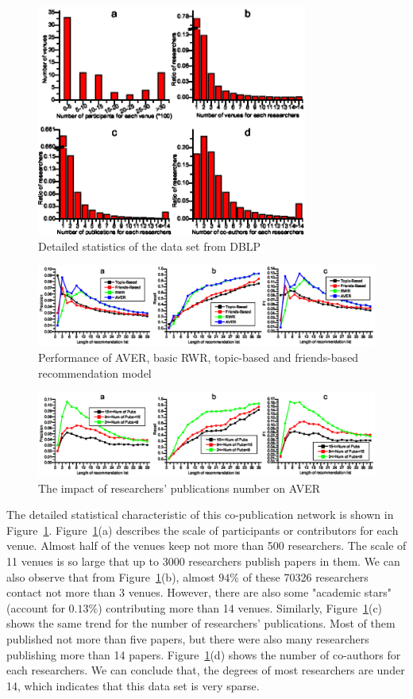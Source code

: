 \documentclass[9pt]{acm_proc_article-sp}
\begin{document}
\begin{figure}[t]
\centering
\includegraphics [width=3.5in]{Fig3.eps}
\caption{Detailed statistics of the data set from DBLP}
\label{fig3}
\end{figure}
\begin{figure}[hbt]
\centering
\includegraphics [width=\textwidth]{Fig4.eps}
\caption{Performance of AVER, basic RWR, topic-based and friends-based recommendation model}
\label{fig4}
\end{figure}
\begin{figure}[hbt]
\centering
\includegraphics [width=\textwidth]{Fig5.eps}
\caption{The impact of researchers' publications number on AVER}
\label{fig5}
\end{figure}

The detailed statistical characteristic of this co-publication network is shown in Figure~\ref{fig3}. Figure~\ref{fig3}(a) describes the scale of participants or contributors for each venue. Almost half of the venues keep not more than 500 researchers. The scale of 11 venues is so large that up to 3000 researchers publish papers in them. We can also observe that from Figure~\ref{fig3}(b), almost $94\%$ of these 70326 researchers contact not more than 3 venues. However, there are also some "academic stars" (account for $0.13\%$) contributing more than 14 venues. Similarly, Figure~\ref{fig3}(c) shows the same trend for the number of researchers' publications. Most of them published not more than five papers, but there were also many researchers publishing more than 14 papers. Figure~\ref{fig3}(d) shows the number of co-authors for each researchers. We can conclude that, the degrees of most researchers are under 14, which indicates that this data set is very sparse.
\end{document}
